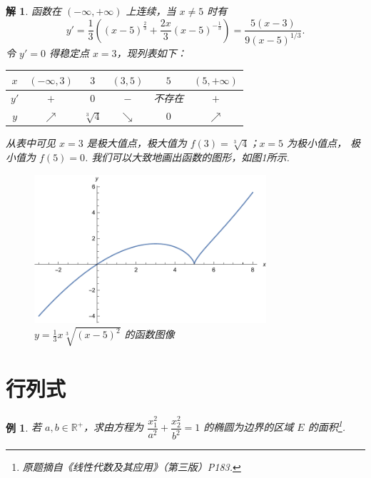 \documentclass[UTF8,11pt]{ctexart}
\newtheorem{sample}{例}
\newtheorem*{solution}{解}
\begin{document}
\begin{solution}
    函数在 $(-\infty, +\infty)$ 上连续，当 $x \neq 5$ 时有
    \begin{equation}
        \label{eq:jizhi}
        y'= \frac{1}{3} \left( (x-5) ^ \frac{2}{3} + \frac{2x}{3} (x-5) 
        ^ {-\frac{1}{3}} \right) = \frac{5(x-3)} {9(x-5) ^ {1/3}} .
    \end{equation}
    令 $y' = 0$ 得稳定点 $x = 3$，现列表如下：

    \begin{table}[htbp]
        \centering
        \begin{tabular}{|c|c|c|c|c|c|} \hline
            $x$ &  $(-\infty , 3)$ & $3$ & $(3 , 5)$ & $5$ & $(5 , +\infty)$\\ \hline
            $y'$ & $+$ & $0$ & $-$ & 不存在 & $+$\\ \hline
            $y$ & $\nearrow$ & $\sqrt[3]{4}$ & $\searrow$ & $0$ & $\nearrow$\\ \hline
        \end{tabular}
    \end{table}
    从表中可见 $x = 3$ 是极大值点，极大值为 $f(3) = \sqrt[3]{4}$；$x = 5$ 为极小值点，
    极小值为 $f(5) = 0$. 我们可以大致地画出函数的图形，如图1所示.
    
    \begin{figure}[htbp]
        \centering
        \includegraphics[width=8.6cm]{fig/function.pdf}
        \caption{$y = \frac{1}{3} x \sqrt[3]{(x-5)^2}$ 的函数图像}
        \label{fig:function}
    \end{figure}
\end{solution}

\section{行列式}
\begin{sample}
    若 $a, b \in \mathbb{R^+}$，求由方程为 $\dfrac{x^2_1}{a^2} + \dfrac{x^2_2}{b^2} = 1$ 的椭圆为边界的区域 $E$ 的面积\footnote{原题摘自《线性代数及其应用》（第三版）P183.}.
\end{sample}
\end{document}
